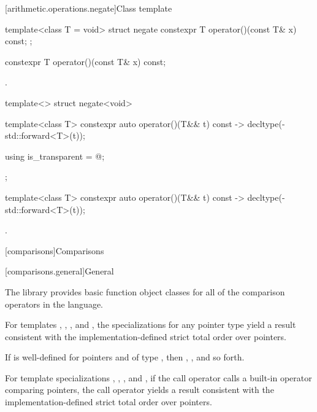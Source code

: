 [arithmetic.operations.negate]{Class template }

%
\begin{itemdecl}
template<class T = void> struct negate {
  constexpr T operator()(const T& x) const;
};
\end{itemdecl}

%
\begin{itemdecl}
constexpr T operator()(const T& x) const;
\end{itemdecl}

\begin{itemdescr}
\pnum
\returns
{}.
\end{itemdescr}

%
\begin{itemdecl}
template<> struct negate<void> {
  template<class T> constexpr auto operator()(T&& t) const
    -> decltype(-std::forward<T>(t));

  using is_transparent = @\unspec@;
};
\end{itemdecl}

%
\begin{itemdecl}
template<class T> constexpr auto operator()(T&& t) const
    -> decltype(-std::forward<T>(t));
\end{itemdecl}

\begin{itemdescr}
\pnum
\returns
{}.
\end{itemdescr}


[comparisons]{Comparisons}

[comparisons.general]{General}

\pnum
The library provides basic function object classes for all of the comparison
operators in the language.

\pnum
For templates , , , and
, the specializations for any pointer type
yield a result consistent with the
implementation-defined strict total order over pointers.
\begin{note}
If  is well-defined
for pointers  and  of type ,
then ,
, and so forth.
\end{note}
For template specializations , ,
, and ,
if the call operator calls a built-in operator comparing pointers,
the call operator yields a result consistent
with the implementation-defined strict total order over pointers.

